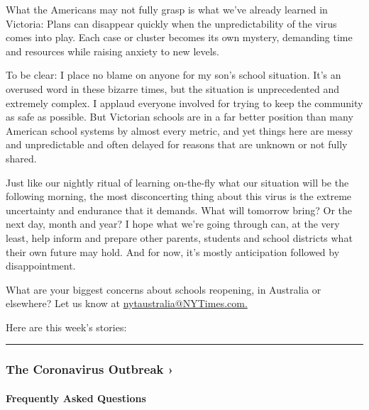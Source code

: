 What the Americans may not fully grasp is what we've already learned in
Victoria: Plans can disappear quickly when the unpredictability of the
virus comes into play. Each case or cluster becomes its own mystery,
demanding time and resources while raising anxiety to new levels.

To be clear: I place no blame on anyone for my son's school situation.
It's an overused word in these bizarre times, but the situation is
unprecedented and extremely complex. I applaud everyone involved for
trying to keep the community as safe as possible. But Victorian schools
are in a far better position than many American school systems by almost
every metric, and yet things here are messy and unpredictable and often
delayed for reasons that are unknown or not fully shared.

Just like our nightly ritual of learning on-the-fly what our situation
will be the following morning, the most disconcerting thing about this
virus is the extreme uncertainty and endurance that it demands. What
will tomorrow bring? Or the next day, month and year? I hope what we're
going through can, at the very least, help inform and prepare other
parents, students and school districts what their own future may hold.
And for now, it's mostly anticipation followed by disappointment.

What are your biggest concerns about schools reopening, in Australia or
elsewhere? Let us know at
\href{mailto:nytaustralia@NYTimes.com}{nytaustralia@NYTimes.com.}

Here are this week's stories:

\begin{center}\rule{0.5\linewidth}{\linethickness}\end{center}

\href{https://www.nytimes3xbfgragh.onion/news-event/coronavirus?action=click\&pgtype=Article\&state=default\&region=MAIN_CONTENT_3\&context=storylines_faq}{}

\hypertarget{the-coronavirus-outbreak-}{%
\subsubsection{The Coronavirus Outbreak
›}\label{the-coronavirus-outbreak-}}

\hypertarget{frequently-asked-questions}{%
\paragraph{Frequently Asked
Questions}\label{frequently-asked-questions}}

